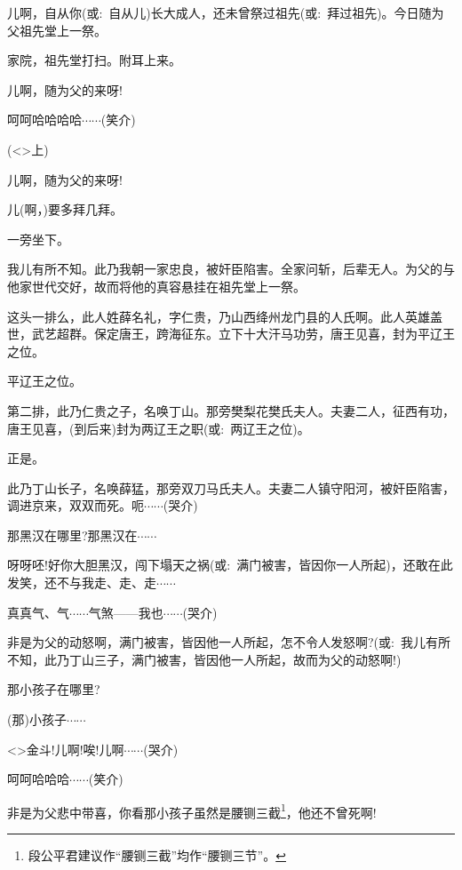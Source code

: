 {儿啊，自从你({\akai 或}:~自从儿)长大成人，还未曾祭过祖先({\akai 或}:~拜过祖先)。今日随为父祖先堂上一祭。

家院，祖先堂打扫。附耳上来。

儿啊，随为父的来呀!

呵呵哈哈哈哈$\cdots{}\cdots{}$({\hwfs 笑介})

\vspace{5pt}

(\textless{}\!\textgreater{}{\hwfs 上})

儿啊，随为父的来呀!

儿(啊，)要多拜几拜。

一旁坐下。

我儿有所不知。此乃我朝一家忠良，被奸臣陷害。全家问斩，后辈无人。为父的与他家世代交好，故而将他的真容悬挂在祖先堂上一祭。

这头一排么，此人姓薛名礼，字仁贵，乃山西绛州龙门县的人氏啊。此人英雄盖世，武艺超群。保定唐王，跨海征东。立下十大汗马功劳，唐王见喜，封为平辽王之位。

平辽王之位。

第二排，此乃仁贵之子，名唤丁山。那旁樊梨花樊氏夫人。夫妻二人，征西有功，唐王见喜，(到后来)封为两辽王之职({\akai 或}:~两辽王之位)。

正是。

此乃丁山长子，名唤薛猛，那旁双刀马氏夫人。夫妻二人镇守阳河，被奸臣陷害，调进京来，双双而死。呃$\cdots{}\cdots{}$({\hwfs 哭}{\hwfs 介})

那黑汉在哪里?那黑汉在$\cdots{}\cdots{}$

呀呀呸!好你大胆黑汉，闯下塌天之祸({\akai 或}:~满门被害，皆因你一人所起)，还敢在此发笑，还不与我走、走、走$\cdots{}\cdots{}$

真真气、气$\cdots{}\cdots{}$气煞------我也$\cdots{}\cdots{}$({\hwfs 哭}{\hwfs 介})

非是为父的动怒啊，满门被害，皆因他一人所起，怎不令人发怒啊?({\akai 或}:~我儿有所不知，此乃丁山三子，满门被害，皆因他一人所起，故而为父的动怒啊!)

那小孩子在哪里?

(那)小孩子$\cdots{}\cdots{}$

\textless{}\!\textgreater{}金斗!儿啊!唉!儿啊$\cdots{}\cdots{}$({\hwfs 哭介})

呵呵哈哈哈$\cdots{}\cdots{}$({\hwfs 笑介})

非是为父悲中带喜，你看那小孩子虽然是腰铡三截\footnote{段公平{\scriptsize 君}建议作``腰铡三截''均作``腰铡三节''。}，他还不曾死啊!

}
